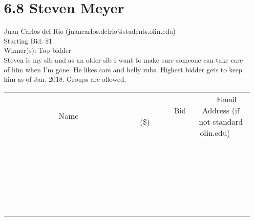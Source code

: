 \documentclass[11pt]{article}
\begin{document}
\section*{6.8 Steven Meyer}
Juan Carlos del Rio (juancarlos.delrio@students.olin.edu) \\
Starting Bid: \$1 \\
Winner(s): 
Top bidder \\
Steven is my sib and as an older sib I want to make sure someone can take care of him when I'm gone. He likes cars and belly rubs. Highest bidder gets to keep him as of Jan. 2018. Groups are allowed. \\[6ex]
\begin{tabular}{c c c}
~~~~~~~~~~~~~Name~~~~~~~~~~~~~ & ~~~~~~~~~Bid (\$)~~~~~~~~~ & ~~~Email Address (if not standard olin.edu)~~~ \\
 & & \\
\hline
 & & \\
\hline
 & & \\
\hline
 & & \\
\hline
 & & \\
\hline
 & & \\
\hline
 & & \\
\hline
 & & \\
\hline
 & & \\
\hline
 & & \\
\hline
 & & \\
\hline
 & & \\
\hline
 & & \\
\hline
 & & \\
\hline
 & & \\
\hline
 & & \\
\hline
 & & \\
\hline
 & & \\
\hline
 & & \\
\hline
 & & \\
\hline
 & & \\
\hline
 & & \\
\hline
 & & \\
\hline
 & & \\
\hline
 & & \\
\hline
 & & \\
\hline
\end{tabular}
\clearpage
\end{document}
